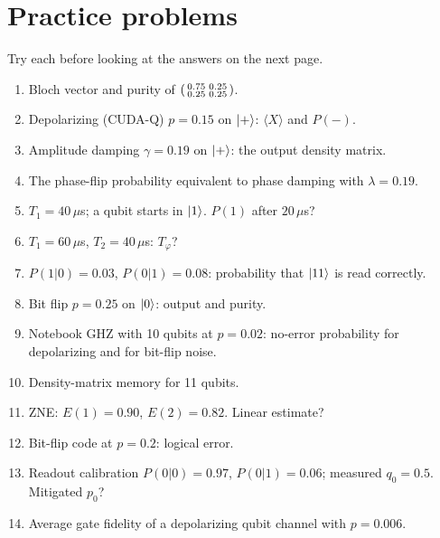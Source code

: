 \documentclass[11pt,a4paper,openany]{book}
\begin{document}
\section{Practice problems}
Try each before looking at the answers on the next page.
\begin{enumerate}[label=\textbf{P\arabic*.}, leftmargin=2.6em, itemsep=3pt]
\item Bloch vector and purity of $\begin{psmallmatrix}0.75 & 0.25\\ 0.25 & 0.25\end{psmallmatrix}$.
\item Depolarizing (CUDA-Q) $p = 0.15$ on $\ket+$: $\langle X\rangle$ and $P(-)$.
\item Amplitude damping $\gamma = 0.19$ on $\ket+$: the output density matrix.
\item The phase-flip probability equivalent to phase damping with $\lambda = 0.19$.
\item $T_1 = 40\,\mu$s; a qubit starts in $\ket1$. $P(1)$ after $20\,\mu$s?
\item $T_1 = 60\,\mu$s, $T_2 = 40\,\mu$s: $T_\varphi$?
\item $P(1|0) = 0.03$, $P(0|1) = 0.08$: probability that $\ket{11}$ is read correctly.
\item Bit flip $p = 0.25$ on $\ket0$: output and purity.
\item Notebook GHZ with 10 qubits at $p = 0.02$: no-error probability for depolarizing and for bit-flip noise.
\item Density-matrix memory for 11 qubits.
\item ZNE: $E(1) = 0.90$, $E(2) = 0.82$. Linear estimate?
\item Bit-flip code at $p = 0.2$: logical error.
\item Readout calibration $P(0|0) = 0.97$, $P(0|1) = 0.06$; measured $q_0 = 0.5$. Mitigated $p_0$?
\item Average gate fidelity of a depolarizing qubit channel with $p = 0.006$.
\end{enumerate}

\newpage
\end{document}
